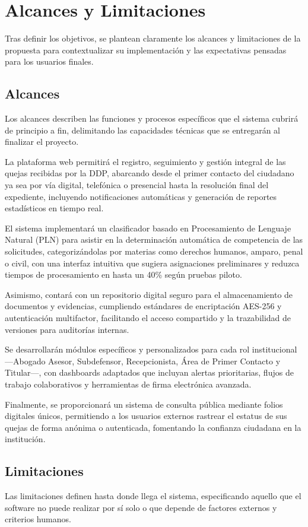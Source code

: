 \section{Alcances y Limitaciones}
Tras definir los objetivos, se plantean claramente los alcances y limitaciones de la propuesta para contextualizar su implementación y las expectativas pensadas para los usuarios finales.

\subsection{Alcances}
Los alcances describen las funciones y procesos específicos que el sistema cubrirá de principio a fin, delimitando las capacidades técnicas que se entregarán al finalizar el proyecto.

La plataforma web permitirá el registro, seguimiento y gestión integral de las quejas recibidas por la DDP, abarcando desde el primer contacto del ciudadano ya sea por vía digital, telefónica o presencial hasta la resolución final del expediente, incluyendo notificaciones automáticas y generación de reportes estadísticos en tiempo real. 

El sistema implementará un clasificador basado en Procesamiento de Lenguaje Natural (PLN) para asistir en la determinación automática de competencia de las solicitudes, categorizándolas por materias como derechos humanos, amparo, penal o civil, con una interfaz intuitiva que sugiera asignaciones preliminares y reduzca tiempos de procesamiento en hasta un 40\% según pruebas piloto. 

Asimismo, contará con un repositorio digital seguro para el almacenamiento de documentos y evidencias, cumpliendo estándares de encriptación AES-256 y autenticación multifactor, facilitando el acceso compartido y la trazabilidad de versiones para auditorías internas. 

Se desarrollarán módulos específicos y personalizados para cada rol institucional —Abogado Asesor, Subdefensor, Recepcionista, Área de Primer Contacto y Titular—, con dashboards adaptados que incluyan alertas prioritarias, flujos de trabajo colaborativos y herramientas de firma electrónica avanzada. 

Finalmente, se proporcionará un sistema de consulta pública mediante folios digitales únicos, permitiendo a los usuarios externos rastrear el estatus de sus quejas de forma anónima o autenticada, fomentando la confianza ciudadana en la institución.
\subsection{Limitaciones}
Las limitaciones definen hasta donde llega el sistema, especificando aquello que el software no puede realizar por sí solo o que depende de factores externos y criterios humanos.

